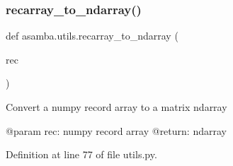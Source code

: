 \subsubsection{\texorpdfstring{recarray\+\_\+to\+\_\+ndarray()}{recarray\_to\_ndarray()}}
{\footnotesize\ttfamily def asamba.\+utils.\+recarray\+\_\+to\+\_\+ndarray (\begin{DoxyParamCaption}\item[{}]{rec }\end{DoxyParamCaption})}

\begin{DoxyVerb}Convert a numpy record array to a matrix ndarray

@param rec: numpy record array
@return: ndarray
\end{DoxyVerb}
 

Definition at line 77 of file utils.\+py.

